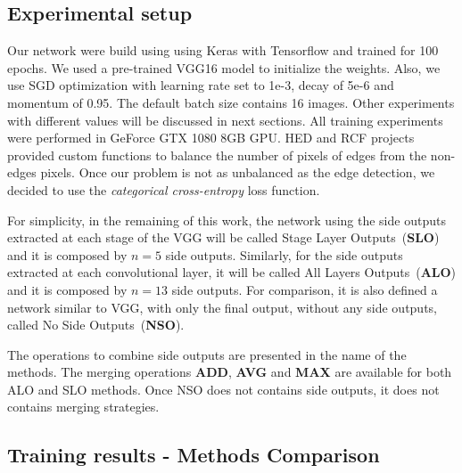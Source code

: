 \subsection{Experimental setup}
   
Our network were build using using Keras \cite{chollet2015keras} with Tensorflow \cite{tensorflow2015-whitepaper} and trained for 100 epochs. We used a pre-trained VGG16 model to initialize the weights. Also, we use SGD optimization with learning rate set to 1e-3, decay of 5e-6 and momentum of 0.95. The default batch size contains 16 images. Other experiments with different values will be discussed in next sections. All training experiments were performed in GeForce GTX 1080 8GB GPU. HED and RCF projects provided custom functions to balance the number of pixels of edges from the non-edges pixels. Once our problem is not as unbalanced as the edge detection, we decided to use the  \textit{{categorical} {cross-entropy}} loss function.

For simplicity, in the remaining of this work, the network using the side outputs extracted at each stage of the VGG will be called Stage Layer Outputs~(\textbf{SLO}) and it is composed by $n=5$ side outputs. Similarly, for the side outputs extracted at each convolutional layer, it will be called All Layers Outputs~(\textbf{ALO}) and it is composed by $n=13$ side outputs. For comparison, it is also defined a network similar to VGG, with only the final output, without any side outputs, called No Side Outputs~(\textbf{NSO}).

The operations to combine side outputs are presented in the name of the methods. The merging operations \textbf{ADD}, \textbf{AVG} and \textbf{MAX} are available for both ALO and SLO methods. Once NSO does not contains side outputs, it does not contains merging strategies.

\subsection{Training results - Methods Comparison}

{\color{red}{Imagem 2 comentada. Texto mantido em vermelho para comparacao}}

